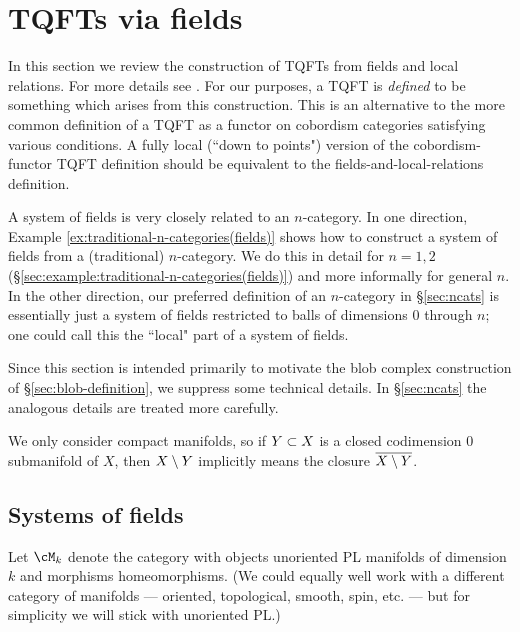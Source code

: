 
\section{TQFTs via fields}
\label{sec:fields}
\label{sec:tqftsviafields}

In this section we review the construction of TQFTs from fields and local relations.
For more details see \cite{kw:tqft}.
For our purposes, a TQFT is {\it defined} to be something which arises
from this construction.
This is an alternative to the more common definition of a TQFT
as a functor on cobordism categories satisfying various conditions.
A fully local (``down to points") version of the cobordism-functor TQFT definition
should be equivalent to the fields-and-local-relations definition.

A system of fields is very closely related to an $n$-category.
In one direction, Example \ref{ex:traditional-n-categories(fields)}
shows how to construct a system of fields from a (traditional) $n$-category.
We do this in detail for $n=1,2$ (\S\ref{sec:example:traditional-n-categories(fields)}) 
and more informally for general $n$.
In the other direction, 
our preferred definition of an $n$-category in \S\ref{sec:ncats} is essentially
just a system of fields restricted to balls of dimensions 0 through $n$;
one could call this the ``local" part of a system of fields.

Since this section is intended primarily to motivate
the blob complex construction of \S\ref{sec:blob-definition}, 
we suppress some technical details.
In \S\ref{sec:ncats} the analogous details are treated more carefully.

\medskip

We only consider compact manifolds, so if $Y \subset X$ is a closed codimension 0
submanifold of $X$, then $X \setminus Y$ implicitly means the closure
$\overline{X \setminus Y}$.


\subsection{Systems of fields}
\label{ss:syst-o-fields}

Let $\cM_k$ denote the category with objects 
unoriented PL manifolds of dimension
$k$ and morphisms homeomorphisms.
(We could equally well work with a different category of manifolds ---
oriented, topological, smooth, spin, etc. --- but for simplicity we
will stick with unoriented PL.)

